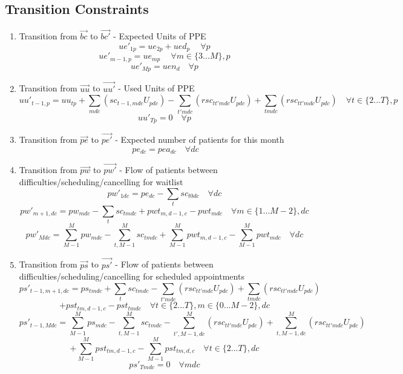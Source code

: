 \documentclass{article}
\begin{document}
\subsection{Transition Constraints}
\begin{enumerate}

	\item Transition from $\vec{bc}$ to $\vec{bc'}$ - Expected Units of PPE
		\[ ue'_{1p} = ue_{2p} + ued_{p}\ \quad \forall p \]
		\[ ue'_{m-1,p} = ue_{mp}\ \quad \forall m \in \{3...M\}, p \]
		\[ ue'_{Mp} = uen_{d} \quad \forall p \]
	
	\item Transition from $\vec{uu}$ to $\vec{uu'}$ - Used Units of PPE
		\[ uu'_{t-1,p} = uu	_{tp} + \sum_{mdc} ( sc_{t-1,mdc}U_{pdc} ) - \sum_{t'mdc} (rsc_{tt'mdc} U_{pdc}) + \sum_{tmdc} (rsc_{tt'mdc} U_{pdc})  \quad \forall t \in \{2...T\}, p \]
		\[ uu'_{Tp} = 0 \quad \forall p \]

	\item Transition from $\vec{pe}$ to $\vec{pe'}$ - Expected number of patients for this month
		\[\ pe_{dc} = pea_{dc} \quad \forall dc \]

	\item Transition from $\vec{pw}$ to $\vec{pw'}$ - Flow of patients between difficulties/scheduling/cancelling for waitlist
		\[ pw'_{1dc} = pe_{dc} - \sum_{t} sc_{t0dc} \quad \forall dc \]
		\[ pw'_{m+1, dc} = pw_{mdc} - \sum_{t} sc_{tmdc} + pwt_{m,d-1,c} - pwt_{mdc} \quad \forall m \in \{1...M-2 \}, dc \]
		\[ pw'_{Mdc} = \sum_{M-1}^M pw_{mdc} - \sum_{t,M-1}^{M} sc_{tmdc} + \sum_{M-1}^{M} pwt_{m,d-1,c} - \sum_{M-1}^{M} pwt_{mdc}\quad \forall dc \]

	\item Transition from $\vec{ps}$ to $\vec{ps'}$ - Flow of patients between difficulties/scheduling/cancelling for scheduled appointments
		\[ ps'_{t-1,m+1,dc} = ps_{tmdc} +  \sum_{t} sc_{tmdc} - 
		\sum_{t'mdc} (rsc_{tt'mdc} U_{pdc}) + \sum_{tmdc} (rsc_{tt'mdc} U_{pdc}) \] 
		\[+ pst_{tm,d-1,c} - pst_{tmdc} \quad \forall t \in \{2 ... T\},  m \in \{0... M-2 \}, dc \]
		\[ ps'_{t-1,Mdc} = \sum_{M-1}^M ps_{mdc}  - \sum_{t,M-1}^{M} sc_{tmdc} -
		\sum_{t',M-1,dc}^M (rsc_{tt'mdc} U_{pdc}) + \sum_{t,M-1,dc}^M (rsc_{tt'mdc} U_{pdc}) \]
		\[ + \sum_{M-1}^{M} pst_{tm,d-1,c} - \sum_{M-1}^{M} pst_{tm,d,c}\quad \forall t \in \{2...T \}, dc \]
		\[ ps'_{Tmdc} = 0 \quad \forall mdc \]
\end{enumerate}
    
\end{document}
